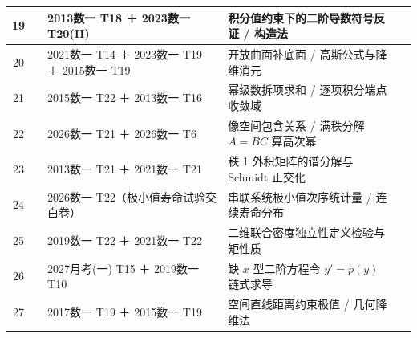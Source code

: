 \documentclass[11pt,a4paper]{ctexart}
\begin{document}
{\begin{tabularx}{\linewidth}{|c|p{1.7cm}|p{3.7cm}|X|p{3.0cm}|}
19 & & 2013数一 T18 ＋ 2023数一 T20(II) & 积分值约束下的二阶导数符号反证 / 构造法 & \\ \hline
20 & & 2021数一 T14 ＋ 2023数一 T19 ＋ 2015数一 T19 & 开放曲面补底面 / 高斯公式与降维消元 & \\ \hline
21 & & 2015数一 T22 ＋ 2013数一 T16 & 幂级数拆项求和 / 逐项积分端点收敛域 & \\ \hline
22 & & 2026数一 T21 ＋ 2026数一 T6 & 像空间包含关系 / 满秩分解 $A=BC$ 算高次幂 & \\ \hline
23 & & 2013数一 T21 ＋ 2021数一 T21 & 秩 1 外积矩阵的谱分解与 Schmidt 正交化 & \\ \hline
24 & & 2026数一 T22（极小值寿命试验交白卷） & 串联系统极小值次序统计量 / 连续寿命分布 & \\ \hline
25 & & 2019数一 T22 ＋ 2021数一 T22 & 二维联合密度独立性定义检验与矩性质 & \\ \hline
26 & & 2027月考(一) T15 ＋ 2019数一 T10 & 缺 $x$ 型二阶方程令 $y'=p(y)$ 链式求导 & \\ \hline
27 & & 2017数一 T19 ＋ 2015数一 T19 & 空间直线距离约束极值 / 几何降维法 & \\ \hline
\end{tabularx}
}
\end{document}
